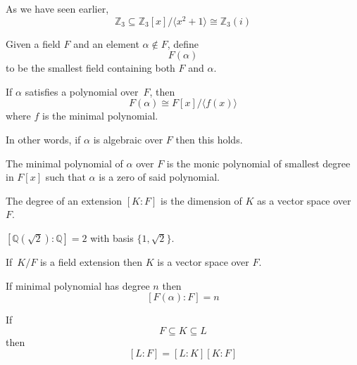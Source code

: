 As we have seen earlier, 
\[
    \mathbb Z_3 \subseteq \mathbb Z_3[x]/\langle x^2 + 1\rangle 
    \cong \mathbb Z_3(i)
\]

\begin{defn}
    Given a field $F$ and an element $\alpha \not\in F$, define 
    \[
        F(\alpha)
    \]
    to be the smallest field containing both $F$ and $\alpha$.
\end{defn}
\begin{thm}
    If $\alpha$ satisfies a polynomial over $F$, then 
    \[
        F(\alpha) \cong F[x]/\langle f(x) \rangle
    \]
    where $f$ is the minimal polynomial.

    In other words, if $\alpha$ is algebraic over $F$ then this 
    holds.
\end{thm}
\begin{defn}
    The minimal polynomial of $\alpha$ over $F$ is  
    the monic polynomial of smallest degree in $F[x]$ such that 
    $\alpha$ is a zero of said polynomial.
\end{defn}
\begin{defn}
    The degree of an extension $[K : F]$ is the dimension of 
    $K$ as a vector space over $F$.
\end{defn}
\begin{ex}
    $[\mathbb Q(\sqrt 2) : \mathbb Q] = 2$ with basis 
    $\{1, \sqrt2\}$.
\end{ex}
\begin{thm}
    If $K/F$ is a field extension then $K$ is a vector space over 
    $F$.
\end{thm}
\begin{thm}
    If minimal polynomial has degree $n$ then 
    \[
        [F(\alpha) : F] = n
    \]
\end{thm}
\begin{thm}
    If 
    \[
        F \subseteq K \subseteq L
    \]
    then 
    \[
        [L : F] = [L : K][K : F]
    \]
\end{thm}

